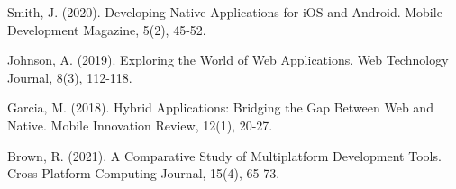 \documentclass{IEEEtran}
\begin{document}
\begin{thebibliography}{99}
 Smith, J. (2020). Developing Native Applications for iOS and Android. Mobile Development Magazine, 5(2), 45-52.

 Johnson, A. (2019). Exploring the World of Web Applications. Web Technology Journal, 8(3), 112-118.

 Garcia, M. (2018). Hybrid Applications: Bridging the Gap Between Web and Native. Mobile Innovation Review, 12(1), 20-27.

 Brown, R. (2021). A Comparative Study of Multiplatform Development Tools. Cross-Platform Computing Journal, 15(4), 65-73.
\end{thebibliography}
\end{document}

